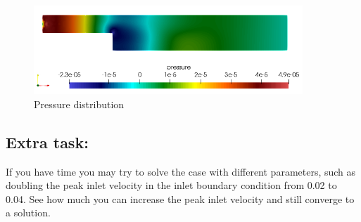 \begin{figure}[H]
\centering
\includegraphics[width=0.9\textwidth]{pressure}
\caption{Pressure distribution}\label{fg:pressure}
\end{figure} 



\subsection*{Extra task:}

If you have time you may try to solve the case with different parameters, such as doubling the peak inlet velocity in the inlet boundary condition from 0.02 to 0.04.  See how much you can increase the peak inlet velocity and still converge to a solution.

\hfill
